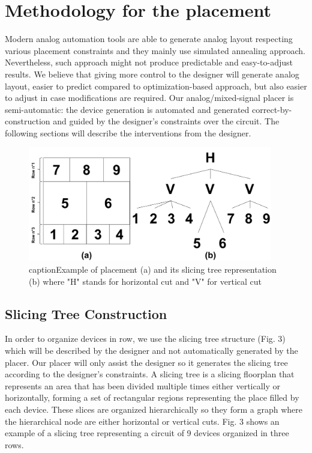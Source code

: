 \chapter{Methodology for the placement}

Modern analog automation tools are able to generate analog layout respecting various placement constraints and they mainly use simulated annealing approach. Nevertheless, such approach might not produce predictable and easy-to-adjust results. We believe that giving more control to the designer will generate analog layout, easier to predict compared to optimization-based approach, but also easier to adjust in case modifications are required. Our analog/mixed-signal placer is semi-automatic: the device generation is automated and generated correct-by-construction and guided by the designer's constraints over the circuit. The following sections will describe the interventions from the designer.

\begin{figure}[h]
\begin{center}
\includegraphics[height=50mm]{Figures/1.png}
caption{Example of placement (a) and its slicing tree representation (b) where "H" stands for horizontal cut and "V" for vertical cut}
\end{center}
\end{figure}
\vspace{-1cm}
\section{Slicing Tree Construction}
In order to organize devices in row, we use the slicing tree structure (Fig. 3) which will be described by the designer and not automatically generated by the placer. Our placer will only assist the designer so it generates the slicing tree according to the designer's constraints. A slicing tree is a slicing floorplan that represents an area that has been divided multiple times either vertically or horizontally, forming a set of rectangular regions representing the place filled by each device. These slices are organized hierarchically so they form a graph where the hierarchical node are either horizontal or vertical cuts. Fig. 3 shows an example of a slicing tree representing a circuit of 9 devices organized in three rows.


